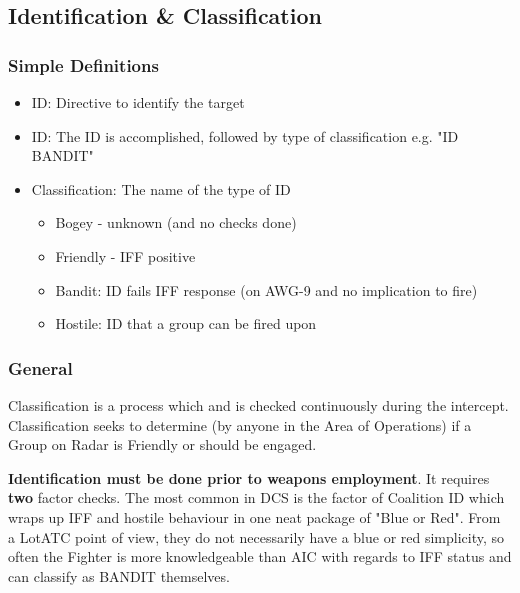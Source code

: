 \subsection{Identification \& Classification}

\subsubsection*{Simple Definitions}

\begin{itemize}
  \item ID: Directive to identify the target

  \item ID: The ID is accomplished, followed by type of classification e.g.
    "ID BANDIT"

  \item Classification: The name of the type of ID

  \begin{itemize}
    \item Bogey - unknown (and no checks done)
    \item Friendly - IFF positive
    \item Bandit: ID fails IFF response (on AWG-9 and no implication to fire)
    \item Hostile: ID that a group can be fired upon
  \end{itemize}

\end{itemize}

\subsubsection*{General}

Classification is a process which and is checked continuously during the
intercept. Classification seeks to determine (by anyone in the Area of
Operations) if a Group on Radar is Friendly or should be engaged.


\textbf{Identification must be done prior to weapons employment}. It requires
\textbf{two} factor checks. The most common in DCS is the factor of Coalition
ID which wraps up IFF and hostile behaviour in one neat package of "Blue or
Red". From a LotATC point of view, they do not necessarily have a blue or red
simplicity, so often the Fighter is more knowledgeable than AIC with regards to
IFF status and can classify as BANDIT themselves.

